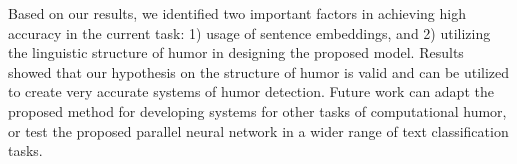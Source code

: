 \documentclass{article}
\begin{document}
Based on our results, we identified two important factors in achieving high accuracy in the current task: 1) usage of sentence embeddings, and 2) utilizing the linguistic structure of humor in designing the proposed model. Results showed that our hypothesis on the structure of humor is valid and can be utilized to create very accurate systems of humor detection. Future work can adapt the proposed method for developing systems for other tasks of computational humor, or test the proposed parallel neural network in a wider range of text classification tasks.










 

\end{document}
